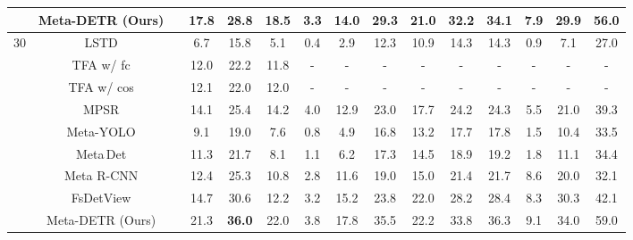 \documentclass[10pt,twocolumn,letterpaper]{article}
\begin{document}
\begin{table*}[t]
\begin{center}
{\begin{tabular}[t]{c|cc|cccccc|cccccc}
&  \cellcolor{black!6} Meta-DETR (Ours)& \cellcolor{black!6} & \cellcolor{black!6}\textbf{17.8} & \cellcolor{black!6}28.8 & \cellcolor{black!6}\textbf{18.5} & \cellcolor{black!6}\textbf{3.3} & \cellcolor{black!6}\textbf{14.0} & \cellcolor{black!6}\textbf{29.3} & \cellcolor{black!6}\textbf{21.0} & \cellcolor{black!6}\textbf{32.2} & \cellcolor{black!6}\textbf{34.1} & \cellcolor{black!6}\textbf{7.9} & \cellcolor{black!6}\textbf{29.9} & \cellcolor{black!6}\textbf{56.0} \\

\midrule[0.68pt]

\multirow{10}{*}{30} & LSTD\;\cite{LSTD} &  & 6.7 & 15.8 & 5.1 & 0.4 & 2.9 & 12.3 & 10.9 & 14.3 & 14.3 & 0.9 & 7.1 & 27.0 \\

& TFA w/ fc\;\cite{fsdet}  &  & 12.0 & 22.2 & 11.8 & - & - & - & - & - & - & - & - & - \\

& TFA w/ cos\;\cite{fsdet}  &  & 12.1 & 22.0 & 12.0 & - & - & - & - & - & - & - & - & - \\

& MPSR\;\cite{MPSR} &  & 14.1 & 25.4 & 14.2 & 4.0 & 12.9 & 23.0 & 17.7 & 24.2 & 24.3 & 5.5 & 21.0 & 39.3 \\

& Meta-YOLO\;\cite{FewshotReweighting} & & 9.1 & 19.0 & 7.6 & 0.8 & 4.9 & 16.8 & 13.2 & 17.7 & 17.8 & 1.5 & 10.4 & 33.5 \\

& Meta\,Det\;\cite{metadet} & & 11.3 & 21.7 & 8.1 & 1.1 & 6.2 & 17.3 & 14.5 & 18.9 & 19.2 & 1.8 & 11.1 & 34.4 \\

& Meta R-CNN\;\cite{metarcnn} & & 12.4 & 25.3 & 10.8 & 2.8 & 11.6 & 19.0 & 15.0 & 21.4 & 21.7 & 8.6 & 20.0 & 32.1 \\

& FsDetView\;\cite{FSDetView} & & 14.7 & 30.6 & 12.2 & 3.2 & 15.2 & 23.8 & 22.0 & 28.2 & 28.4 & 8.3 & 30.3 & 42.1 \\

&  \cellcolor{black!6} Meta-DETR (Ours) & \cellcolor{black!6} & \cellcolor{black!6}21.3 & \cellcolor{black!6}\textbf{36.0} & \cellcolor{black!6}22.0 & \cellcolor{black!6}3.8 & \cellcolor{black!6}17.8 & \cellcolor{black!6}35.5 & \cellcolor{black!6}22.2 & \cellcolor{black!6}33.8 & \cellcolor{black!6}36.3 & \cellcolor{black!6}9.1 & \cellcolor{black!6}34.0 & \cellcolor{black!6}59.0 \\


\end{tabular}}
\end{center}
\end{table*}
\end{document}
